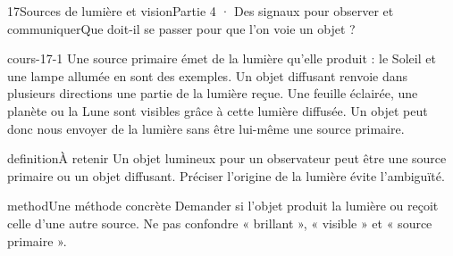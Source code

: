 \documentclass[12pt,twoside,openany]{book}
\begin{document}
\clearpage\pagestyle{otMain}
\begin{ouverture}[college4]{17}{Sources de lumière et vision}{Partie 4 · Des signaux pour observer et communiquer}{Que doit-il se passer pour que l’on voie un objet ?}
\end{ouverture}
\label{ch-17-cours-1}
\label{ess-17}
\begin{pcFiche}{cours-17-1}
Une source primaire émet de la lumière qu’elle produit : le Soleil et une lampe allumée en sont des exemples. Un objet diffusant renvoie dans plusieurs directions une partie de la lumière reçue. Une feuille éclairée, une planète ou la Lune sont visibles grâce à cette lumière diffusée. Un objet peut donc nous envoyer de la lumière sans être lui-même une source primaire.\par
{}
\begin{pcEncadre}{definition}{À retenir}
Un objet lumineux pour un observateur peut être une source primaire ou un objet diffusant. Préciser l’origine de la lumière évite l’ambiguïté.\par
\end{pcEncadre}
\begin{pcEncadre}{method}{Une méthode concrète}
Demander si l’objet produit la lumière ou reçoit celle d’une autre source. Ne pas confondre « brillant », « visible » et « source primaire ».\par
\end{pcEncadre}
\end{pcFiche}
\label{ch-17-cours-2}
\end{document}

